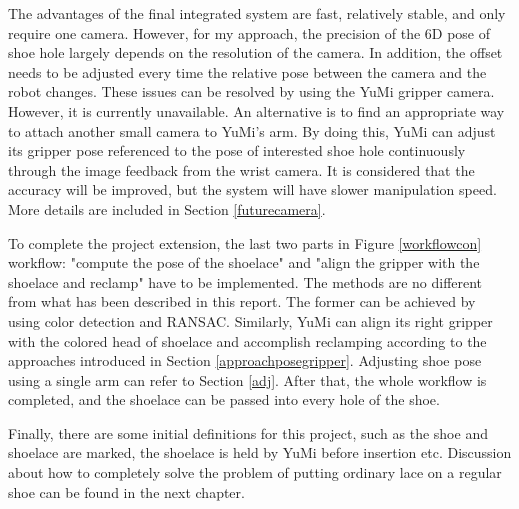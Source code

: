 The advantages of the final integrated system are fast, relatively stable, and only require one camera. However, for my approach, the precision of the 6D pose of shoe hole largely depends on the resolution of the camera. In addition, the offset needs to be adjusted every time the relative pose between the camera and the robot changes. These issues can be resolved by using the YuMi gripper camera. However, it is currently unavailable. An alternative is to find an appropriate way to attach another small camera to YuMi's arm. By doing this, YuMi can adjust its gripper pose referenced to the pose of interested shoe hole continuously through the image feedback from the wrist camera. It is considered that the accuracy will be improved, but the system will have slower manipulation speed. More details are included in Section \ref{futurecamera}.

To complete the project extension, the last two parts in Figure \ref{workflowcon} workflow: "compute the pose of the shoelace" and "align the gripper with the shoelace and reclamp" have to be implemented. The methods are no different from what has been described in this report. The former can be achieved by using color detection and RANSAC. Similarly, YuMi can align its right gripper with the colored head of shoelace and accomplish reclamping according to the approaches introduced in Section \ref{approachposegripper}. Adjusting shoe pose using a single arm can refer to Section \ref{adj}. After that, the whole workflow is completed, and the shoelace can be passed into every hole of the shoe.

Finally, there are some initial definitions for this project, such as the shoe and shoelace are marked, the shoelace is held by YuMi before insertion etc. Discussion about how to completely solve the problem of putting ordinary lace on a regular shoe can be found in the next chapter. 


